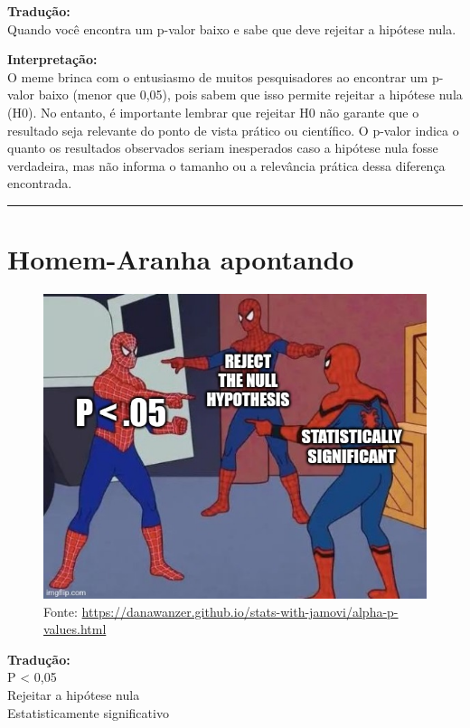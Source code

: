 \documentclass[
]{book}
\begin{document}
\textbf{Tradução:}\\
Quando você encontra um p-valor baixo e sabe que deve rejeitar a hipótese nula.

\textbf{Interpretação:}\\
O meme brinca com o entusiasmo de muitos pesquisadores ao encontrar um p-valor baixo (menor que 0,05), pois sabem que isso permite rejeitar a hipótese nula (H0). No entanto, é importante lembrar que rejeitar H0 não garante que o resultado seja relevante do ponto de vista prático ou científico. O p-valor indica o quanto os resultados observados seriam inesperados caso a hipótese nula fosse verdadeira, mas não informa o tamanho ou a relevância prática dessa diferença encontrada.

\begin{center}\rule{0.5\linewidth}{0.5pt}\end{center}

\section{Homem-Aranha apontando}\label{homem-aranha-apontando}

\begin{figure}
\centering
\includegraphics{p-value3.jpg}
\caption{Fonte: \url{https://danawanzer.github.io/stats-with-jamovi/alpha-p-values.html}}
\end{figure}

\textbf{Tradução:}\\
P \textless{} 0,05\\
Rejeitar a hipótese nula\\
Estatisticamente significativo
\end{document}
